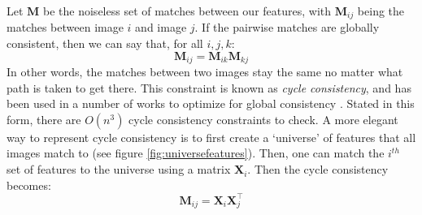 \documentclass[10pt,twocolumn,letterpaper]{article}
\newcommand{\mat}[1]{\mathbf{#1}}
\begin{document}
Let $\mat{M}$ be the noiseless set of matches between our features, with $\mat{M}_{ij}$ being the matches between image $i$ and image $j$.
If the pairwise matches are globally consistent, then we can say that, for all $i, j, k$:
\begin{equation}
\mat{M}_{ij} = \mat{M}_{ik} \mat{M}_{kj}
\label{eq:cycconsist1}
\end{equation}
In other words, the matches between two images stay the same no matter what path is taken to get there. 
This constraint is known as \textit{cycle consistency}, and has been used in a number of works to optimize for global consistency \cite{zhou2015multi, wang2017multi, leonardos2016distributed}.
Stated in this form, there are $O(n^3)$ cycle consistency constraints to check.
A more elegant way to represent cycle consistency is to first create a `universe' of features that all images match to (see figure \ref{fig:universefeatures}).
Then, one can match the $i^{th}$ set of features to the universe using a matrix $\mat{X}_i$.
Then the cycle consistency becomes:
\begin{equation}
\mat{M}_{ij} = \mat{X}_{i}\mat{X}_{j}^\top
\label{eq:cycconsist2}
\end{equation}
\end{document}
